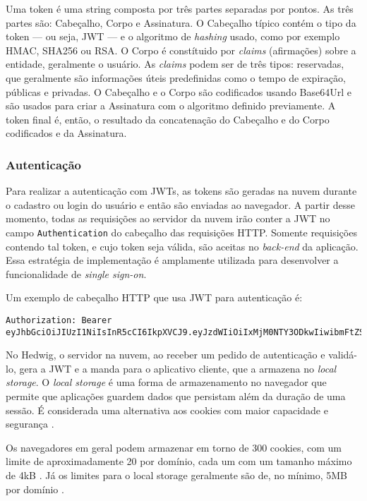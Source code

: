 Uma token é uma string composta por três partes separadas por pontos. As três partes são: Cabeçalho, Corpo e Assinatura. O Cabeçalho típico contém o tipo da token --- ou seja, JWT --- e o algoritmo de \textit{hashing} usado, como por exemplo HMAC, SHA256 ou RSA. O Corpo é constítuido por \textit{claims} (afirmações) sobre a entidade, geralmente o usuário. As \textit{claims} podem ser de três tipos: reservadas, que geralmente são informações úteis predefinidas como o tempo de expiração, públicas e privadas. O Cabeçalho e o Corpo são codificados usando Base64Url e são usados para criar a Assinatura com o algoritmo definido previamente. A token final é, então, o resultado da concatenação do Cabeçalho e do Corpo codificados e da Assinatura.

\subsubsection{Autenticação}

Para realizar a autenticação com JWTs, as tokens são geradas na nuvem durante o cadastro ou login do usuário e então são enviadas ao navegador. A partir desse momento, todas as requisições ao servidor da nuvem irão conter a JWT no campo \texttt{Authentication} do cabeçalho das requisições HTTP. Somente requisições contendo tal token, e cujo token seja válida, são aceitas no \emph{back-end} da aplicação. Essa estratégia de implementação é amplamente utilizada para desenvolver a funcionalidade de \textit{single sign-on}.

Um exemplo de cabeçalho HTTP que usa JWT para autenticação é:

\begin{lstlisting}
Authorization: Bearer eyJhbGciOiJIUzI1NiIsInR5cCI6IkpXVCJ9.eyJzdWIiOiIxMjM0NTY3ODkwIiwibmFtZSI6IkpvaG4gRG9lIiwiYWRtaW4iOnRydWV9.TJVA95OrM7E2cBab30RMHrHDcEfxjoYZgeFONFh7HgQ
\end{lstlisting}

No Hedwig, o servidor na nuvem, ao receber um pedido de autenticação e validá-lo, gera a JWT e a manda para o aplicativo cliente, que a armazena no \textit{local storage}. O \textit{local storage} é uma forma de armazenamento no navegador que permite que aplicações guardem dados que persistam além da duração de uma sessão. É considerada uma alternativa aos cookies com maior capacidade e segurança \cite{w3cWebStorage}.

Os navegadores em geral podem armazenar em torno de 300 cookies, com um limite de aproximadamente 20 por domínio, cada um com um tamanho máximo de 4kB \cite{cookies}. Já os limites para o local storage geralmente são de, no mínimo, 5MB por domínio \cite{localstorage}.

